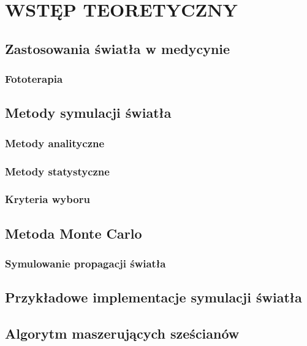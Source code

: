 \chapter{WSTĘP TEORETYCZNY}
\label{chpt:wstęp-teoretyczny}
\section{Zastosowania światła w medycynie}
\subsection{Fototerapia}
\section{Metody symulacji światła}
\subsection{Metody analityczne}
\subsection{Metody statystyczne}
\subsection{Kryteria wyboru}
\section{Metoda Monte Carlo}
\subsection{Symulowanie propagacji światła}
\section{Przykładowe implementacje symulacji światła}
\section{Algorytm maszerujących sześcianów}

